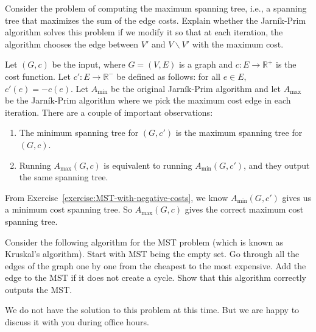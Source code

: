 \begin{flex}
\begin{exercise}  \label{exercise:Maximum-spanning-tree}
Consider the problem of computing the maximum spanning tree, i.e., a spanning tree that maximizes the sum of the edge costs. Explain whether the Jarn\'{i}k-Prim algorithm solves this problem if we modify it so that at each iteration, the algorithm chooses the edge between $V'$ and $V\backslash V'$ with the maximum cost.
\end{exercise}

\begin{solution}
Let $(G,c)$ be the input, where $G = (V,E)$ is a graph and $c: E \to \mathbb{R}^+$ is the cost function. Let $c' : E \to \mathbb{R}^{-}$ be defined as follows: for all $e \in E$, $c'(e) = - c(e)$. Let $A_{\min}$ be the original Jarn\'{i}k-Prim algorithm and let $A_{\max}$ be the Jarn\'{i}k-Prim algorithm where we pick the maximum cost edge in each iteration.  There are a couple of important observations:
\begin{enumerate}
    \item The minimum spanning tree for $(G,c')$ is the maximum spanning tree for $(G,c)$. 
    \item Running $A_{\max}(G,c)$ is equivalent to running $A_{\min}(G,c')$, and they output the same spanning tree. 
\end{enumerate}
From Exercise~\ref{exercise:MST-with-negative-costs}, we know $A_{\min}(G,c')$ gives us a minimum cost spanning tree. So $A_{\max}(G,c)$ gives the correct maximum cost spanning tree.
\end{solution}
\end{flex}


\begin{flex}
\begin{exercise}  \label{exercise:Kruskals-algorithm}
Consider the following algorithm for the MST problem (which is known as Kruskal's algorithm). Start with MST being the empty set. Go through all the edges of the graph one by one from the cheapest to the most expensive. Add the edge to the MST if it does not create a cycle. Show that this algorithm correctly outputs the MST.
\end{exercise}

\begin{solution}
We do not have the solution to this problem at this time. But we are happy to discuss it with you during office hours.
\end{solution}
\end{flex}





